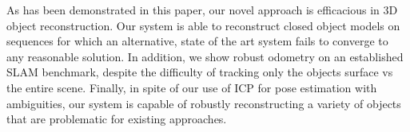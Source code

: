As has been demonstrated in this paper, our novel approach is efficacious in 3D object 
reconstruction. Our system is able to reconstruct closed object models on sequences for which an alternative, state of 
the art system \cite{Ren2013} fails to converge to any reasonable solution. In addition, we show robust odometry on an 
established SLAM benchmark, despite the difficulty of tracking only the objects surface vs the entire scene. Finally,
in spite of our use of ICP for pose estimation with ambiguities, our system is capable of robustly reconstructing a 
variety of objects that are problematic for existing approaches.